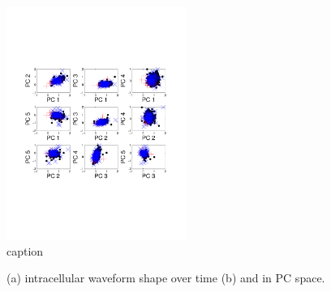 \begin{figure}[htbp]
	\centering
		\includegraphics[height=3in]{../figs/new/pairs.pdf}
	\caption{caption}
	\label{fig:pairs}
\end{figure}



\begin{figure}[htbp]
	\centering
	\caption{(a) intracellular waveform shape over time (b) and in PC space.}
	\label{fig:pairs}
\end{figure}



